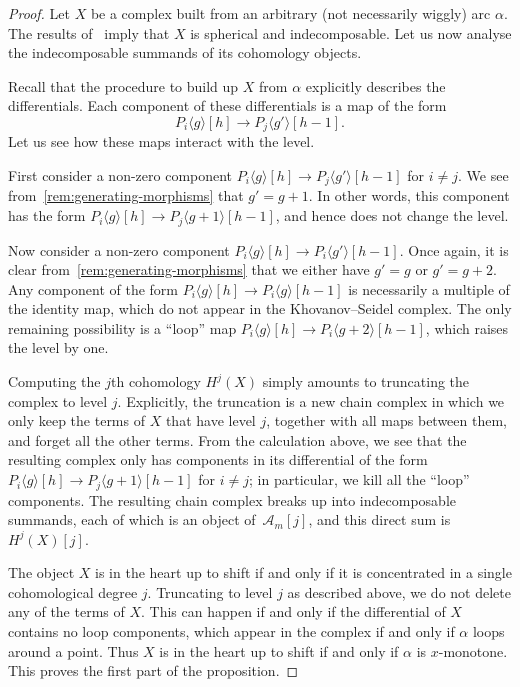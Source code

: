 \documentclass{amsart}
\theoremstyle{definition}
\begin{document}
\begin{proof}
  Let \(X\) be a complex built from an arbitrary (not necessarily wiggly) arc \(\alpha\).
  The results of~\cite{kho.sei:02} imply that \(X\) is spherical and indecomposable.
  Let us now analyse the indecomposable summands of its cohomology objects.
  
  Recall that the procedure to build up \(X\) from \(\alpha\) explicitly describes the differentials.    
  Each component of these differentials is a map of the form
  \[P_i\langle g \rangle[h] \to P_j\langle g' \rangle[h-1].\]
  Let us see how these maps interact with the level.
  
  First consider a non-zero component \(P_i\langle g \rangle[h] \to P_j\langle g' \rangle[h-1]\) for \(i \neq j\).
  We see from~\cref{rem:generating-morphisms} that \(g' = g+1\).
  In other words, this component has the form
  \(P_i\langle g \rangle[h] \to P_j\langle g+1 \rangle[h-1]\),
  and hence does not change the level.
  
  Now consider a non-zero component \(P_i\langle g \rangle[h] \to P_i\langle g' \rangle[h-1]\).
  Once again, it is clear from~\cref{rem:generating-morphisms} that we either have \(g' = g\) or \(g' = g + 2\).
  Any component of the form \(P_i \langle g \rangle[h] \to P_i\langle g \rangle[h-1]\)
  is necessarily a multiple of the identity map, which do not appear in the Khovanov--Seidel complex.
  The only remaining possibility is a ``loop'' map \(P_i \langle g \rangle[h] \to P_i\langle g+2 \rangle[h-1]\), which raises the level by one.

  Computing the \(j\)th cohomology \(H^j(X)\) simply amounts to truncating the complex to level \(j\).
  Explicitly, the truncation is a new chain complex in which we only keep the terms of \(X\) that have level \(j\), together with all maps between them, and forget all the other terms.
  From the calculation above, we see that the resulting complex only has components in its differential of the form \(P_i\langle g \rangle[h] \to P_j\langle g+1 \rangle[h-1]\) for \(i \neq j\); in particular, we kill all the ``loop'' components.
  The resulting chain complex breaks up into indecomposable summands, each of which is an object of~\(\mathcal{A}_m[j]\), and this direct sum is \(H^j(X)[j]\).
  
  The object \(X\) is in the heart up to shift if and only if it is concentrated in a single cohomological degree \(j\).
  Truncating to level \(j\) as described above, we do not delete any of the terms of \(X\).
  This can happen if and only if the differential of \(X\) contains no loop components,
  which appear in the complex if and only if \(\alpha\) loops around a point.
  Thus \(X\) is in the heart up to shift if and only if \(\alpha\) is  \(x\)-monotone.
  This proves the first part of the proposition.


\end{proof}
\end{document}
